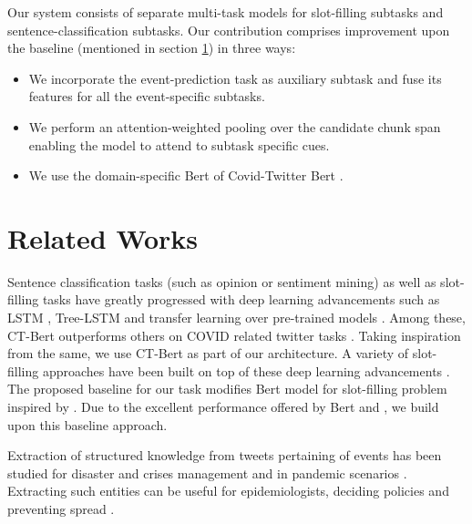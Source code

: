 \documentclass[11pt,a4paper]{article}
\begin{document}
Our system consists of separate multi-task models for slot-filling subtasks and sentence-classification subtasks.
Our contribution comprises improvement upon the baseline
(mentioned in section \ref{sec:rl}) in three ways:

\begin{itemize}
    \item We incorporate the event-prediction task as auxiliary subtask and fuse its features for all the event-specific subtasks.
    
    \item We perform an attention-weighted pooling over the candidate chunk span enabling the model to attend to subtask specific cues.
    
    \item We use the domain-specific Bert of Covid-Twitter Bert \cite{ctbert}.
\end{itemize}


\section{Related Works}\label{sec:rl}

Sentence classification tasks (such as opinion or sentiment mining) as well as slot-filling tasks have greatly progressed with deep learning advancements such as LSTM \cite{lstmpaper}, Tree-LSTM \cite{treelstmpaper} and transfer learning over pre-trained models \citep{elmopaper, ulmfitpaper, bertpaper}. 
Among these, CT-Bert outperforms others on COVID related twitter tasks \citep{ctbert}. Taking inspiration from the same, we use CT-Bert as part of our architecture.
A variety of slot-filling approaches have been built on top of these deep learning advancements \citep{slot_filling1, slot_filling2}. The proposed baseline for our task \cite{zong2020extracting} modifies Bert model for slot-filling problem inspired by \citet{baldinisoares-etal-2019matching}. Due to the excellent performance offered by Bert \cite{bertpaper} and \citet{baldinisoares-etal-2019matching}, we build upon this baseline approach.

Extraction of structured knowledge from tweets pertaining of events \cite{benson_etal_2011_event} has been studied for disaster and crises management \cite{disaster_events1, disaster_events3} and in pandemic scenarios \cite{social_media_for_pandemic}. Extracting such entities can be useful for epidemiologists, deciding policies and preventing spread \cite{social_media_for_pandemic, zong2020extracting}.
\end{document}
